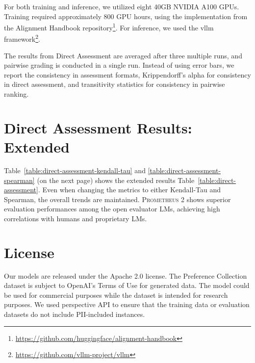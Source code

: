 \documentclass[11pt]{article}
\begin{document}
For both training and inference, we utilized eight 40GB NVIDIA A100 GPUs. Training required approximately 800 GPU hours, using the implementation from the Alignment Handbook repository\footnote{\href{https://github.com/huggingface/alignment-handbook}{https://github.com/huggingface/alignment-handbook}}. For inference, we used the vllm framework\footnote{\href{https://github.com/vllm-project/vllm}{https://github.com/vllm-project/vllm}}.

The results from Direct Assessment are averaged after three multiple runs, and pairwise grading is conducted in a single run. Instead of using error bars, we report the consistency in assessment formats, Krippendorff's alpha for consistency in direct assessment, and transitivity statistics for consistency in pairwise ranking.

\section{Direct Assessment Results: Extended}\label{appendix:direct-assessment}

Table~\ref{table:direct-assessment-kendall-tau} and \ref{table:direct-assessment-spearman} (on the next page) shows the extended results Table~\ref{table:direct-assessment}. Even when changing the metrics to either Kendall-Tau and Spearman, the overall trends are maintained. \textsc{Prometheus 2} shows superior evaluation performances among the open evaluator LMs, achieving high correlations with humans and proprietary LMs.

\section{License}

Our models are released under the Apache 2.0 license. The Preference Collection dataset is subject to OpenAI's Terms of Use for generated data. The model could be used for commercial purposes while the dataset is intended for research purposes. We used perspective API to ensure that the training data or evaluation datasets do not include PII-included instances.

\clearpage
\end{document}
